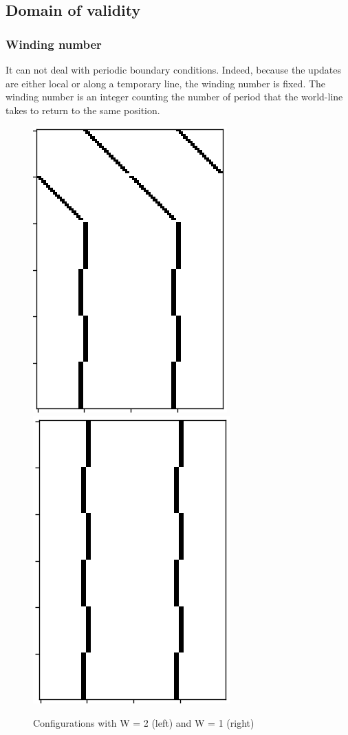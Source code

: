 \documentclass[a4paper,12pt,twoside]{article}
\begin{document}
		 	
		 	
 	\subsection{Domain of validity}
 	\subsubsection{Winding number}
 	It can not deal with periodic boundary conditions. Indeed, because the updates are either local or along a temporary line, the winding number is fixed. The winding number is an integer counting the number of period that the world-line takes to return to the same position. 
 	\begin{figure}[!h]
 		\centering
 		\includegraphics[]{Pattern_winding.png}
 		\includegraphics[]{Pattern_nowinding.png}
 		\caption{Configurations with W = 2 (left) and W = 1 (right)}
 		\label{winding}			
 	\end{figure}
	
\end{document}
